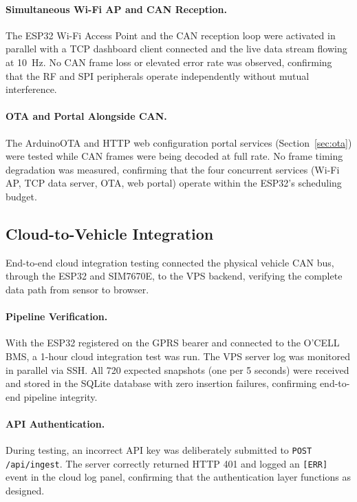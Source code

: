 \paragraph{Simultaneous Wi-Fi AP and CAN Reception.}
The ESP32 Wi-Fi Access Point and the CAN reception loop were activated in parallel with a TCP dashboard client connected and the live data stream flowing at 10~Hz. No CAN frame loss or elevated error rate was observed, confirming that the RF and SPI peripherals operate independently without mutual interference.

\paragraph{OTA and Portal Alongside CAN.}
The ArduinoOTA and HTTP web configuration portal services (Section~\ref{sec:ota}) were tested while CAN frames were being decoded at full rate. No frame timing degradation was measured, confirming that the four concurrent services (Wi-Fi AP, TCP data server, OTA, web portal) operate within the ESP32's scheduling budget.

\subsection{Cloud-to-Vehicle Integration}

End-to-end cloud integration testing connected the physical vehicle CAN bus, through the ESP32 and SIM7670E, to the VPS backend, verifying the complete data path from sensor to browser.

\paragraph{Pipeline Verification.}
With the ESP32 registered on the GPRS bearer and connected to the O'CELL BMS, a 1-hour cloud integration test was run. The VPS server log was monitored in parallel via SSH. All 720 expected snapshots (one per 5 seconds) were received and stored in the SQLite database with zero insertion failures, confirming end-to-end pipeline integrity.

\paragraph{API Authentication.}
During testing, an incorrect API key was deliberately submitted to \texttt{POST /api/ingest}. The server correctly returned HTTP 401 and logged an \texttt{[ERR]} event in the cloud log panel, confirming that the authentication layer functions as designed.

